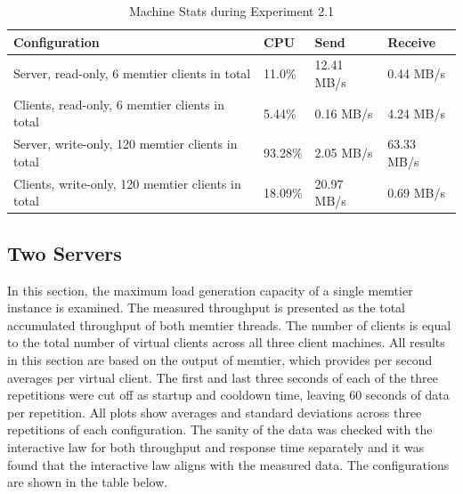 \documentclass[11pt,a4paper]{article}
\begin{document}
\begin{center}
    \begin{table}
    	\begin{tabular}{|l|p{2cm}|p{2cm}|p{4cm}|}
            \hline \textbf{Configuration} & \textbf{CPU} & \textbf{Send} & \textbf{Receive}\\
            \hline Server, read-only, 6 memtier clients in total & 11.0\%         & 12.41 MB/s    & 0.44 MB/s\\
            \hline Clients, read-only, 6 memtier clients in total & 5.44\%           & 0.16 MB/s     & 4.24 MB/s\\
            \hline Server, write-only,  120 memtier clients in total & 93.28\%        & 2.05 MB/s     & 63.33 MB/s\\
            \hline Clients, write-only, 120 memtier clients in total & 18.09\%       & 20.97 MB/s     & 0.69 MB/s\\
            \hline
    	\end{tabular}
	\caption{Machine Stats during Experiment 2.1}
    \label{dstat:2-1}
	\end{table}
\end{center}

\subsection{Two Servers}
In this section, the maximum load generation capacity of a single memtier instance is examined. The measured throughput is presented as the total accumulated throughput of both memtier threads. The number of clients is equal to the total number of virtual clients across all three client machines. All results in this section are based on the output of memtier, which provides per second averages per virtual client. The first and last three seconds of each of the three repetitions were cut off as startup and cooldown time, leaving 60 seconds of data per repetition. All plots show averages and standard deviations across three repetitions of each configuration. The sanity of the data was checked with the interactive law for both throughput and response time separately and it was found that the interactive law aligns with the measured data. The configurations are shown in the table below.
\end{document}
